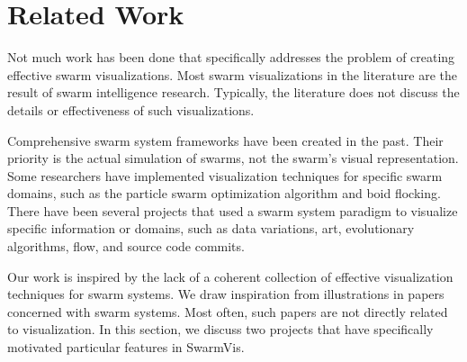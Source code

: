 \documentclass{vgtc}
\begin{document}
\section{Related Work}
Not much work has been done that specifically addresses the problem of creating effective swarm visualizations.
Most swarm visualizations in the literature are the result of swarm intelligence research.
Typically, the literature does not discuss the details or effectiveness of such visualizations. 

Comprehensive  swarm system frameworks\cite{Luke}\cite{860347} have been created in the past.
Their priority is the actual simulation of swarms, not the swarm's visual representation.
Some researchers have implemented visualization techniques for specific swarm domains,
such as the particle swarm optimization algorithm\cite{Secrest} and boid flocking\cite{reynolds1987}.
There have been several projects that used a swarm system paradigm to visualize specific information or domains, such as data variations\cite{1382896}, art\cite{Boyd}, evolutionary algorithms\cite{spector2005ecb}\cite{Spector02evolutionarydynamics},
flow\cite{10.1109/TVCG.2005.87}\cite{Merzkirch}, and source code commits\cite{codeswarm:website}.

Our work is inspired by the lack of a coherent collection of effective visualization techniques for swarm systems.
We draw inspiration from illustrations in papers concerned with swarm systems. Most often, such papers are not directly related to visualization.
In this section, we discuss two projects that have specifically motivated particular features in SwarmVis.
\end{document}
